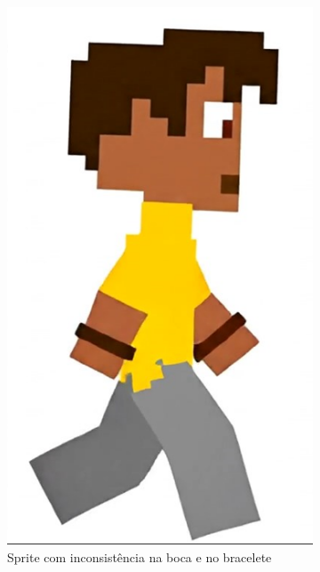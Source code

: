 \begin{figure}[htbp]
\begin{subfigure}{0.32\linewidth}
        \includegraphics[width=0.7\linewidth]{figs/geminiPro/chat7/sprite2.PNG}
        \caption{\small Sprite com inconsistência na boca e no bracelete}
        \label{fig:GeminiProAndarComparaSide2Sprite1}
    \end{subfigure}
    \begin{subfigure}{0.32\linewidth}
        \centering

\end{subfigure}
\end{figure}

